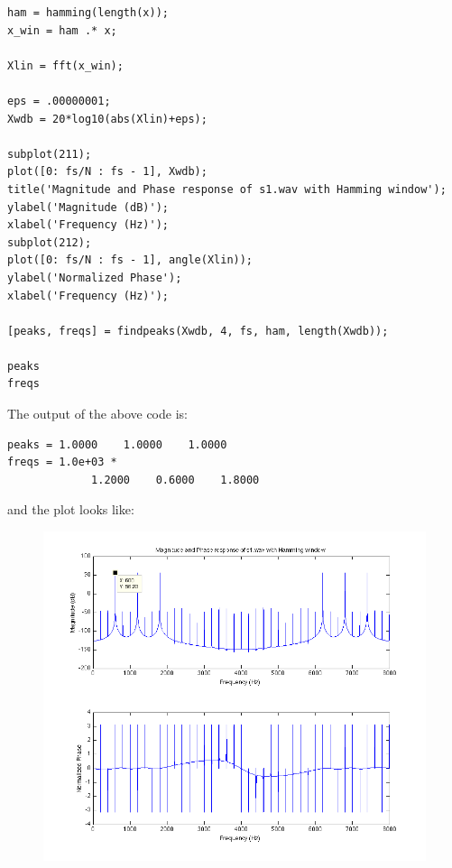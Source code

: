 \documentclass[11pt]{article}
\begin{document}
\begin{enumerate}
\begin{verbatim}
ham = hamming(length(x));
x_win = ham .* x;

Xlin = fft(x_win);

eps = .00000001;
Xwdb = 20*log10(abs(Xlin)+eps);

subplot(211);
plot([0: fs/N : fs - 1], Xwdb);
title('Magnitude and Phase response of s1.wav with Hamming window');
ylabel('Magnitude (dB)');
xlabel('Frequency (Hz)');
subplot(212);
plot([0: fs/N : fs - 1], angle(Xlin));
ylabel('Normalized Phase');
xlabel('Frequency (Hz)');

[peaks, freqs] = findpeaks(Xwdb, 4, fs, ham, length(Xwdb));

peaks
freqs
\end{verbatim}
The output of the above code is:
\begin{verbatim}
peaks = 1.0000    1.0000    1.0000
freqs = 1.0e+03 *
             1.2000    0.6000    1.8000
\end{verbatim}
\newpage
and the plot looks like:
\begin{figure}[!h]
\includegraphics[scale=.7]{p1d}
\end{figure}
\end{enumerate}
\end{document}
